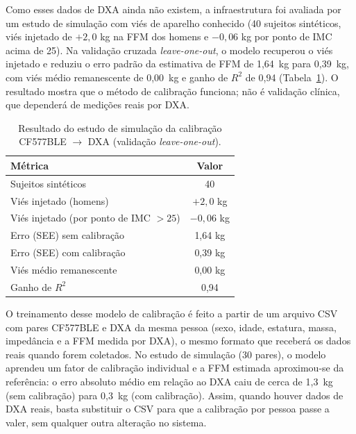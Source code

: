 Como esses dados de DXA ainda não existem, a infraestrutura foi avaliada por um estudo de
simulação com viés de aparelho conhecido (40 sujeitos sintéticos, viés injetado de $+2{,}0$
kg na FFM dos homens e $-0{,}06$ kg por ponto de IMC acima de 25). Na validação cruzada
\emph{leave-one-out}, o modelo recuperou o viés injetado e reduziu o erro padrão da
estimativa de FFM de 1,64~kg para 0,39~kg, com viés médio remanescente de 0,00~kg e ganho de
$R^2$ de 0,94 (Tabela~\ref{tab:calibracao}). O resultado mostra que o método de calibração
funciona; não é validação clínica, que dependerá de medições reais por DXA.

\begin{table}[H]
    \centering
    \caption{Resultado do estudo de simulação da calibração CF577BLE $\rightarrow$ DXA (validação \emph{leave-one-out}).}
    \label{tab:calibracao}
    \begin{tabular}{lc}
        \toprule
        Métrica & Valor \\
        \midrule
        Sujeitos sintéticos & 40 \\
        Viés injetado (homens) & $+2{,}0$ kg \\
        Viés injetado (por ponto de IMC $>25$) & $-0{,}06$ kg \\
        Erro (SEE) sem calibração & 1,64 kg \\
        Erro (SEE) com calibração & 0,39 kg \\
        Viés médio remanescente & 0,00 kg \\
        Ganho de $R^2$ & 0,94 \\
        \bottomrule
    \end{tabular}
\end{table}

O treinamento desse modelo de calibração é feito a partir de um arquivo CSV com pares
CF577BLE e DXA da mesma pessoa (sexo, idade, estatura, massa, impedância e a FFM medida por
DXA), o mesmo formato que receberá os dados reais quando forem coletados. No estudo de
simulação (30 pares), o modelo aprendeu um fator de calibração individual e a FFM estimada
aproximou-se da referência: o erro absoluto médio em relação ao DXA caiu de cerca de 1,3~kg
(sem calibração) para 0,3~kg (com calibração). Assim, quando houver dados de DXA reais, basta
substituir o CSV para que a calibração por pessoa passe a valer, sem qualquer outra alteração
no sistema.

